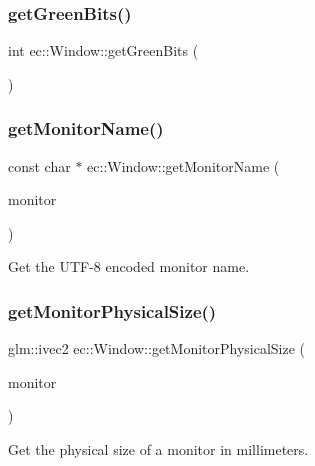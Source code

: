 \subsubsection{\texorpdfstring{get\+Green\+Bits()}{getGreenBits()}}
{\footnotesize\ttfamily int ec\+::\+Window\+::get\+Green\+Bits (\begin{DoxyParamCaption}{ }\end{DoxyParamCaption})\hspace{0.3cm}{\ttfamily [static]}}

\mbox{\label{classec_1_1_window_ad382278721c5532b83962bcd5e405d17}} 
\subsubsection{\texorpdfstring{get\+Monitor\+Name()}{getMonitorName()}}
{\footnotesize\ttfamily const char $\ast$ ec\+::\+Window\+::get\+Monitor\+Name (\begin{DoxyParamCaption}\item[{G\+L\+F\+Wmonitor $\ast$}]{monitor }\end{DoxyParamCaption})\hspace{0.3cm}{\ttfamily [static]}}

Get the U\+T\+F-\/8 encoded monitor name. \mbox{\label{classec_1_1_window_ace0f9940b132f4c072e1b2a1a6f72217}} 
\subsubsection{\texorpdfstring{get\+Monitor\+Physical\+Size()}{getMonitorPhysicalSize()}}
{\footnotesize\ttfamily glm\+::ivec2 ec\+::\+Window\+::get\+Monitor\+Physical\+Size (\begin{DoxyParamCaption}\item[{G\+L\+F\+Wmonitor $\ast$}]{monitor }\end{DoxyParamCaption})\hspace{0.3cm}{\ttfamily [static]}}

Get the physical size of a monitor in millimeters. \mbox{\label{classec_1_1_window_aa7be3b867cfa6fa26f347eaa6a1d92ee}} 
